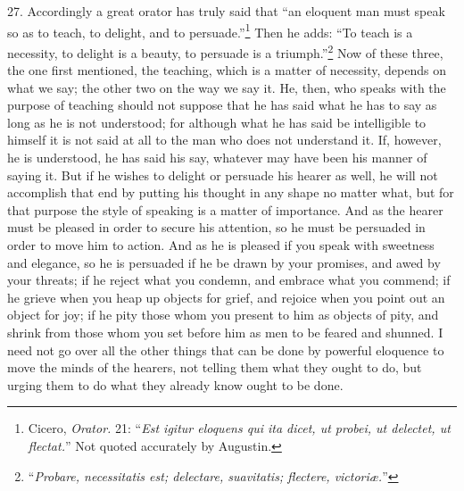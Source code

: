 27. Accordingly a great orator has truly said that “an eloquent man must speak so as to teach, to delight, and to persuade.”\footnote{Cicero, \emph{Orator.} 21: “\emph{Est igitur eloquens qui ita dicet, ut probei, ut delectet, ut flectat.}” Not quoted accurately by Augustin.} Then he adds: “To teach is a necessity, to delight is a beauty, to persuade is a triumph.”\footnote{“\emph{Probare, necessitatis est; delectare, suavitatis; flectere, victoriæ.}”} Now of these three, the one first mentioned, the teaching, which is a matter of necessity, depends on what we say; the other two on the way we say it. He, then, who speaks with the purpose of teaching should not suppose that he has said what he has to say as long as he is not understood; for although what he has said be intelligible to himself it is not said at all to the man who does not understand it. If, however, he is understood, he has said his say, whatever may have been his manner of saying it. But if he wishes to delight or persuade his hearer as well, he will not accomplish that end by putting his thought in any shape no matter what, but for that purpose the style of speaking is a matter of importance. And as the hearer must be pleased in order to secure his attention, so he must be persuaded in order to move him to action. And as he is pleased if you speak with sweetness and elegance, so he is persuaded if he be drawn by your promises, and awed by your threats; if he reject what you condemn, and embrace what you commend; if he grieve when you heap up objects for grief, and rejoice when you point out an object for joy; if he pity those whom you present to him as objects of pity, and shrink from those whom you set before him as men to be feared and shunned. I need not go over all the other things that can be done by powerful eloquence to move the minds of the hearers, not telling them what they ought to do, but urging them to do what they already know ought to be done.

